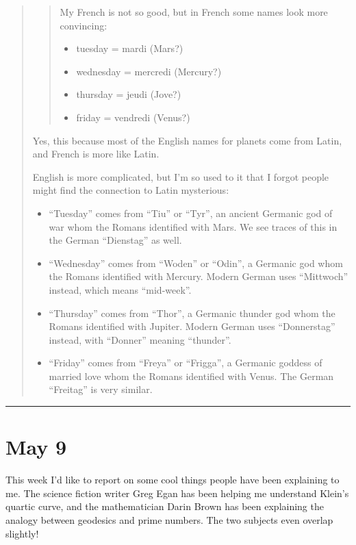\documentclass{article}
\def\tightlist{}
\begin{document}
\begin{quote}
\begin{quote}
My French is not so good, but in French some names look more convincing:

\begin{itemize}
\tightlist
\item
  tuesday = mardi (Mars?)
\item
  wednesday = mercredi (Mercury?)
\item
  thursday = jeudi (Jove?)
\item
  friday = vendredi (Venus?)
\end{itemize}
\end{quote}

Yes, this because most of the English names for planets come from Latin,
and French is more like Latin.

English is more complicated, but I'm so used to it that I forgot people
might find the connection to Latin mysterious:

\begin{itemize}
\tightlist
\item
  ``Tuesday'' comes from ``Tiu'' or ``Tyr'', an ancient Germanic god of
  war whom the Romans identified with Mars. We see traces of this in the
  German ``Dienstag'' as well.
\item
  ``Wednesday'' comes from ``Woden'' or ``Odin'', a Germanic god whom
  the Romans identified with Mercury. Modern German uses ``Mittwoch''
  instead, which means ``mid-week''.
\item
  ``Thursday'' comes from ``Thor'', a Germanic thunder god whom the
  Romans identified with Jupiter. Modern German uses ``Donnerstag''
  instead, with ``Donner'' meaning ``thunder''.
\item
  ``Friday'' comes from ``Freya'' or ``Frigga'', a Germanic goddess of
  married love whom the Romans identified with Venus. The German
  ``Freitag'' is very similar.
\end{itemize}
\end{quote}

\begin{center}\rule{0.5\linewidth}{0.5pt}\end{center}



\hypertarget{week215}{%
\section{May 9}\label{week215}}

This week I'd like to report on some cool things people have been
explaining to me. The science fiction writer Greg Egan has been helping
me understand Klein's quartic curve, and the mathematician Darin Brown
has been explaining the analogy between geodesics and prime numbers. The
two subjects even overlap slightly!
\end{document}
